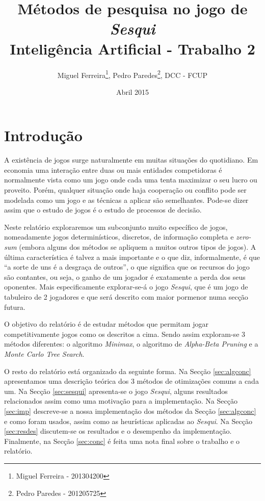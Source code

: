 \documentclass[12pt,a4paper,oneside]{article}
\title{Métodos de pesquisa no jogo de \textit{Sesqui}\\
  \vspace{0.1in}
  \large{Inteligência Artificial - Trabalho 2}
}
\author{Miguel Ferreira\footnote{Miguel Ferreira - 201304200}, Pedro Paredes\footnote{Pedro Paredes - 201205725}, DCC - FCUP}
\date{Abril 2015}
\begin{document}
\maketitle


\section{Introdução}
\label{sec:intro}

A existência de jogos surge naturalmente em muitas situações do
quotidiano. Em economia uma interação entre duas ou mais entidades
competidoras é normalmente vista como um jogo onde cada uma tenta
maximizar o seu lucro ou proveito. Porém, qualquer situação onde haja
cooperação ou conflito pode ser modelada como um jogo e as técnicas a
aplicar são semelhantes. Pode-se dizer assim que o estudo de jogos é o
estudo de processos de decisão.

Neste relatório exploraremos um subconjunto muito específico de jogos,
nomeadamente jogos determinísticos, discretos, de informação completa
e \textit{zero-sum} (embora alguns dos métodos se apliquem a muitos
outros tipos de jogos). A última característica é talvez a mais
importante e o que diz, informalmente, é que ``a sorte de uns é a
desgraça de outros'', o que significa que os recursos do jogo são
contantes, ou seja, o ganho de um jogador é exatamente a perda dos
seus oponentes. Mais especificamente explorar-se-á o jogo
\textit{Sesqui}, que é um jogo de tabuleiro de 2 jogadores e que será
descrito com maior pormenor numa secção futura.

O objetivo do relatório é de estudar métodos que permitam jogar
competitivamente jogos como os descritos a cima. Sendo assim
exploram-se 3 métodos diferentes: o algoritmo \textit{Minimax}, o
algoritmo de \textit{Alpha-Beta Pruning} e a \textit{Monte Carlo Tree
  Search}.

O resto do relatório está organizado da seguinte forma. Na Secção
\ref{sec:algconc} apresentamos uma descrição teórica dos 3 métodos de
otimizações comuns a cada um. Na Secção \ref{sec:sesqui} apresenta-se
o jogo \textit{Sesqui}, alguns resultados relacionados assim como uma
motivação para a implementação. Na Secção \ref{sec:imp} descreve-se a
nossa implementação dos métodos da Secção \ref{sec:algconc} e como
foram usados, assim como as heurísticas aplicadas ao
\textit{Sesqui}. Na Secção \ref{sec:resdes} discutem-se os resultados
e o desempenho da implementação. Finalmente, na Secção \ref{sec:conc}
é feita uma nota final sobre o trabalho e o relatório.
\end{document}
